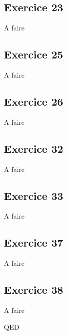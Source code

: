 \documentclass[]{book}
\theoremstyle{definition}
\begin{document}
\subsection*{Exercice 23}
A faire



\subsection*{Exercice 25}
A faire


\subsection*{Exercice 26}
A faire



\subsection*{Exercice 32}
A faire


\subsection*{Exercice 33}
A faire


\subsection*{Exercice 37}
A faire


\subsection*{Exercice 38}
A faire


QED
\end{document}
